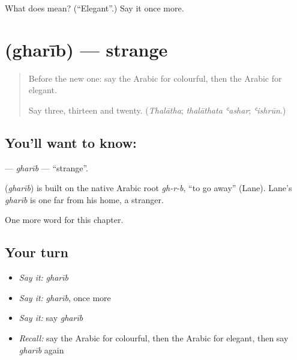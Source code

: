 \begin{tcolorbox}[breakable,colback=teal!4,colframe=teal!35!black,title={Before you move on}]
What does  mean? (\textquotedblleft{}Elegant\textquotedblright{}.) Say it once more.
\end{tcolorbox}
\section[\texorpdfstring{\ar{غريب} (gharīb)}{غريب (gharīb)}]{ (gharīb) — strange}

\label{lesson:AR-C149-gharib}



\begin{quote}
Before the new one: say the Arabic for colourful, then the Arabic for elegant.

Say three, thirteen and twenty. (\emph{Thalātha}; \emph{thalāthata ʿashar}; \emph{ʿishrūn}.)
\end{quote}

\subsection*{You'll want to know: }
\textbf{} — \emph{gharīb} — \textquotedblleft{}strange\textquotedblright{}.

\begin{cousinweb}
\textbf{} (\emph{gharīb}) is built on the native Arabic root \emph{gh-r-b}, \textquotedblleft{}to go away\textquotedblright{} (Lane). Lane's \emph{gharīb} is one far from his home, a stranger.
\end{cousinweb}

\begin{grammarlens}[title={What you've built}]
One more word for this chapter.
\end{grammarlens}

\subsection*{Your turn}
\begin{itemize}
\raggedright
  \item \emph{Say it:} \emph{gharīb}
  \item \emph{Say it:} \emph{gharīb}, once more
  \item \emph{Say it:} say \emph{gharīb}
  \item \emph{Recall:} say the Arabic for colourful, then the Arabic for elegant, then say \emph{gharīb} again
\end{itemize}

